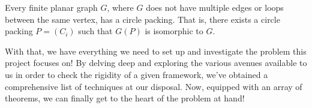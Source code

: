 \begin{theorem}
\label{thm: circle packing theorem}
Every finite planar graph $G$, where $G$ does not have multiple edges or loops between the same vertex, has a circle packing. That is, there exists a circle packing $P = (C_i)$ such that $G(P)$ is isomorphic to $G$.
\end{theorem}

\begin{flushleft}
With that, we have everything we need to set up and investigate the problem this project focuses on! By delving deep and exploring the various avenues available to us in order to check the rigidity of a given framework, we've obtained a comprehensive list of techniques at our disposal. Now, equipped with an array of theorems, we can finally get to the heart of the problem at hand!
\end{flushleft}

